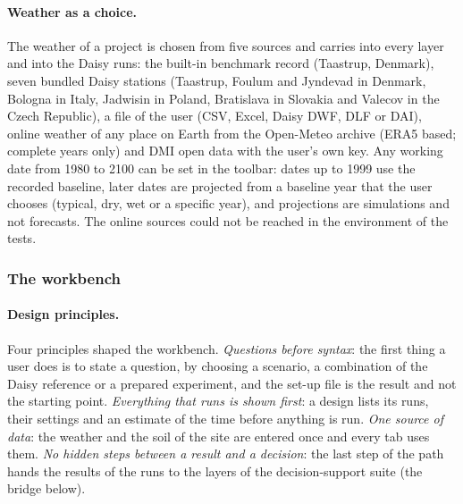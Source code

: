 \documentclass[preprint,12pt]{elsarticle}
\begin{document}
\paragraph{Weather as a choice.}
The weather of a project is chosen from five sources and carries into every layer and into the Daisy runs: the built-in benchmark record (Taastrup, Denmark), seven bundled Daisy stations (Taastrup, Foulum and Jyndevad in Denmark, Bologna in Italy, Jadwisin in Poland, Bratislava in Slovakia and Valecov in the Czech Republic), a file of the user (CSV, Excel, Daisy DWF, DLF or DAI), online weather of any place on Earth from the Open-Meteo archive (ERA5 based; complete years only) and DMI open data with the user's own key. Any working date from 1980 to 2100 can be set in the toolbar: dates up to 1999 use the recorded baseline, later dates are projected from a baseline year that the user chooses (typical, dry, wet or a specific year), and projections are simulations and not forecasts. The online sources could not be reached in the environment of the tests.

\subsubsection{The workbench}
\paragraph{Design principles.}
Four principles shaped the workbench. \emph{Questions before syntax}: the first thing a user does is to state a question, by choosing a scenario, a combination of the Daisy reference or a prepared experiment, and the set-up file is the result and not the starting point. \emph{Everything that runs is shown first}: a design lists its runs, their settings and an estimate of the time before anything is run. \emph{One source of data}: the weather and the soil of the site are entered once and every tab uses them. \emph{No hidden steps between a result and a decision}: the last step of the path hands the results of the runs to the layers of the decision-support suite (the bridge below).
\end{document}
